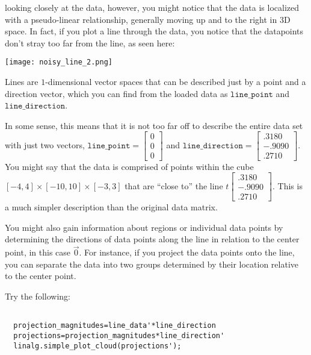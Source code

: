 \documentclass{ximera}
\begin{document}
looking closely at the data, however, you might notice that the data is localized with a pseudo-linear relationship, generally moving up and to the right in 3D space. In fact, if you plot a line through the data, you notice that the datapoints don't stray too far from the line, as seen here:


\begin{center}
  \texttt{[image: noisy\_line\_2.png]}
\end{center}

Lines are $1$-dimensional vector spaces that can be described just by a point and a direction vector, which you can find from the loaded data as $\texttt{line\_point}$ and $\texttt{line\_direction}$. 

In some sense, this means that it is not too far off to describe the entire data set with just two vectors, $\texttt{line\_point}=\begin{bmatrix}0\\0\\0\end{bmatrix}$ and $\texttt{line\_direction}=\begin{bmatrix}.3180\\-.9090\\.2710\end{bmatrix}$. You might say that the data is comprised of points within the cube $[-4,4]\times[-10,10]\times[-3,3]$ that are ``close to'' the line $t\begin{bmatrix}.3180\\-.9090\\.2710\end{bmatrix}$. This is a much simpler description than the original data matrix. 

You might also gain information about regions or individual data points by determining the directions of data points along the line in relation to the center point, in this case $\vec{0}$. For instance, if you project the data points onto the line, you can separate the data into two groups determined by their location relative to the center point. 

Try the following:

\begin{verbatim}

  projection_magnitudes=line_data'*line_direction
  projections=projection_magnitudes*line_direction'
  linalg.simple_plot_cloud(projections');

\end{verbatim}
\end{document}
